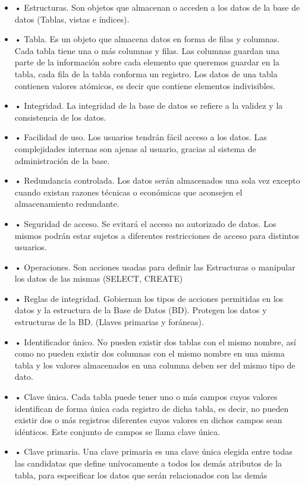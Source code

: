 \begin{itemize}
\item
• Estructuras. Son objetos que almacenan o acceden a los datos de la base
de datos (Tablas, vistas e índices). 
\item
• Tabla. Es un objeto que almacena datos en forma de filas y columnas. Cada
tabla tiene una o más columnas y filas. Las columnas guardan una parte de
la información sobre cada elemento que queremos guardar en la tabla, cada
fila de la tabla conforma un registro. Los datos de una tabla contienen valores
atómicos, es decir que contiene elementos indivisibles.
\item
• Integridad. La integridad de la base de datos se refiere a la validez y la
consistencia de los datos.
\item
• Facilidad de uso. Los usuarios tendrán fácil acceso a los datos. Las
complejidades internas son ajenas al usuario, gracias al sistema de
administración de la base.
\item
• Redundancia controlada. Los datos serán almacenados una sola vez
excepto cuando existan razones técnicas o económicas que aconsejen el
almacenamiento redundante.
\item
• Seguridad de acceso. Se evitará el acceso no autorizado de datos. Los
mismos podrán estar sujetos a diferentes restricciones de acceso para
distintos usuarios.
\item
• Operaciones. Son acciones usadas para definir las Estructuras o manipular
los datos de las mismas (SELECT, CREATE)
\item
• Reglas de integridad. Gobiernan los tipos de acciones permitidas en los
datos y la estructura de la Base de Datos (BD). Protegen los datos y
estructuras de la BD. (Llaves primarias y foráneas).
\item
• Identificador único. No pueden existir dos tablas con el mismo nombre, así
como no pueden existir dos columnas con el mismo nombre en una misma
tabla y los valores almacenados en una columna deben ser del mismo tipo
de dato.
\item
• Clave única. Cada tabla puede tener uno o más campos cuyos valores
identifican de forma única cada registro de dicha tabla, es decir, no pueden
existir dos o más registros diferentes cuyos valores en dichos campos sean
idénticos. Este conjunto de campos se llama clave única. 
\item
• Clave primaria. Una clave primaria es una clave única elegida entre todas
las candidatas que define unívocamente a todos los demás atributos de la
tabla, para especificar los datos que serán relacionados con las demás

\end{itemize}
